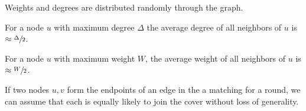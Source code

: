 \begin{assm}
Weights and degrees are distributed randomly through the graph.
\end{assm}
\begin{assm}
For a node $u$ with maximum degree $\Delta$ the average degree of all neighbors of $u$ is $\approx \sfrac{\Delta}{2}$.
\end{assm}
\begin{assm}
For a node $u$ with maximum weight $W$, the average weight of all neighbors of $u$ is $\approx \sfrac{W}{2}$.
\end{assm}
\begin{assm}
If two nodes $u,v$ form the endpoints of an edge in the a matching for a round, we can assume that each is equally likely to join the cover without loss of generality.
\end{assm}

